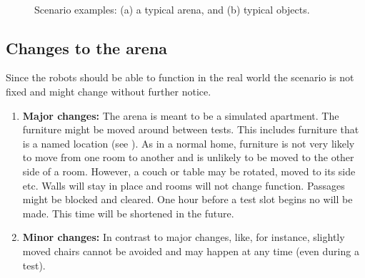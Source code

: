 \begin{figure}[tbp]
	\centering
	 ~ 
	\caption{Scenario examples: (a) a typical arena, and (b) typical objects.}
	\label{fig:arena}
\end{figure}



\subsection{Changes to the arena}
\label{rule:scenario_changes}

Since the robots should be able to function in the real world the scenario is not fixed and might change without further notice.
\begin{enumerate}
	\item \textbf{Major changes:} 
	The arena is meant to be a simulated apartment. 
	The furniture might be moved around between tests. 
	This includes furniture that is a named location (see ).
	As in a normal home, furniture is not very likely to move from one room to another and is unlikely to be moved to the other side of a room.
	However, a couch or table may be rotated, moved to its side etc. 
	Walls will stay in place and rooms will not change function.
	Passages might be blocked and cleared. 
	One hour before a test slot begins no  will be made.
	This time will be shortened in the future. 
	\item \textbf{Minor changes:} In contrast to major changes,  like, for instance, slightly moved chairs cannot be avoided and may happen at any time (even during a test). 
\end{enumerate}


